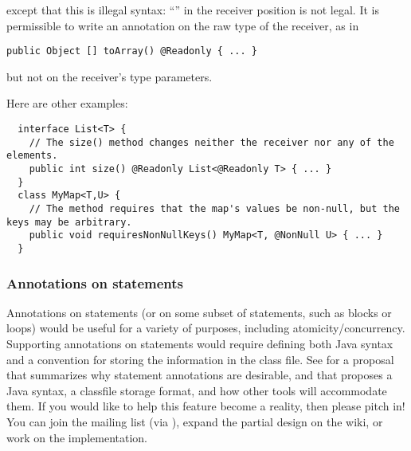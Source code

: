 \documentclass[10pt]{article}
\begin{document}
\noindent
except that this is illegal syntax:  ``'' in
the receiver position is not legal.  It is permissible to write an
annotation on the raw type of the receiver, as in

\begin{Verbatim}
public Object [] toArray() @Readonly { ... }
\end{Verbatim}

\noindent
but not on the receiver's type parameters.

Here are other examples:

\begin{Verbatim}
  interface List<T> {
    // The size() method changes neither the receiver nor any of the elements.
    public int size() @Readonly List<@Readonly T> { ... }
  }
  class MyMap<T,U> {
    // The method requires that the map's values be non-null, but the keys may be arbitrary.
    public void requiresNonNullKeys() MyMap<T, @NonNull U> { ... }
  }
\end{Verbatim}




\subsubsection{Annotations on statements\label{statement-annotations}}

Annotations on statements (or on some subset of statements, such as blocks
or loops) would be useful for a variety of purposes, including
atomicity/concurrency.  Supporting annotations on statements would require
defining both Java syntax and a convention for storing the information in
the class file.  See
 for a
proposal that summarizes why statement annotations are desirable, and that
proposes a Java syntax, a classfile storage format, and how other tools
will accommodate them.  If you would like to help this feature become a
reality, then please pitch in!  You can join the
 mailing list (via
),
expand the partial design on the wiki, or work on the implementation.
\end{document}
